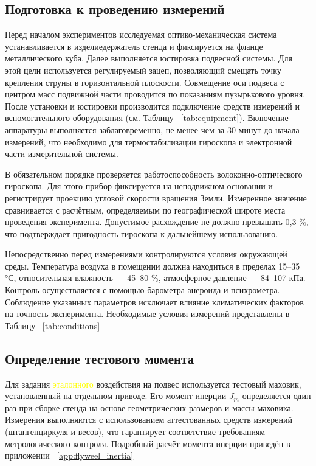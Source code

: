 \subsection{Подготовка к проведению измерений}

Перед началом экспериментов исследуемая оптико-механическая система устанавливается в изделиедержатель стенда и фиксируется на фланце металлического куба. Далее выполняется юстировка подвесной системы. Для этой цели используется регулируемый зацеп, позволяющий смещать точку крепления струны в горизонтальной плоскости. Совмещение оси подвеса с центром масс подвижной части проводится по показаниям пузырькового уровня. После установки и юстировки производится подключение средств измерений и вспомогательного оборудования (см. Таблицу ~\cref{tab:equipment}). Включение аппаратуры выполняется заблаговременно, не менее чем за 30 минут до начала измерений, что необходимо для термостабилизации гироскопа и электронной части измерительной системы.

В обязательном порядке проверяется работоспособность волоконно-оптического гироскопа. Для этого прибор фиксируется на неподвижном основании и регистрирует проекцию угловой скорости вращения Земли. Измеренное значение сравнивается с расчётным, определяемым по географической широте места проведения эксперимента. Допустимое расхождение не должно превышать 0,3 \%, что подтверждает пригодность гироскопа к дальнейшему использованию. %


Непосредственно перед измерениями контролируются условия окружающей среды. Температура воздуха в помещении должна находиться в пределах 15–35 °С, относительная влажность — 45–80 \%, атмосферное давление — 84–107 кПа. Контроль осуществляется с помощью барометра-анероида и психрометра. Соблюдение указанных параметров исключает влияние климатических факторов на точность эксперимента. Необходимые условия измерений представлены в Таблицу ~\cref{tab:conditions}

\subsection{Определение тестового момента}

Для задания \textcolor{yellow}{эталонного} воздействия на подвес используется тестовый маховик, установленный на отдельном приводе. Его момент инерции $J_m$ определяется один раз при сборке стенда на основе геометрических размеров и массы маховика. Измерения выполняются с использованием аттестованных средств измерений (штангенциркуля и весов), что гарантирует соответствие требованиям метрологического контроля. Подробный расчёт момента инерции приведён в приложении ~\ref{app:flyweel_inertia}

